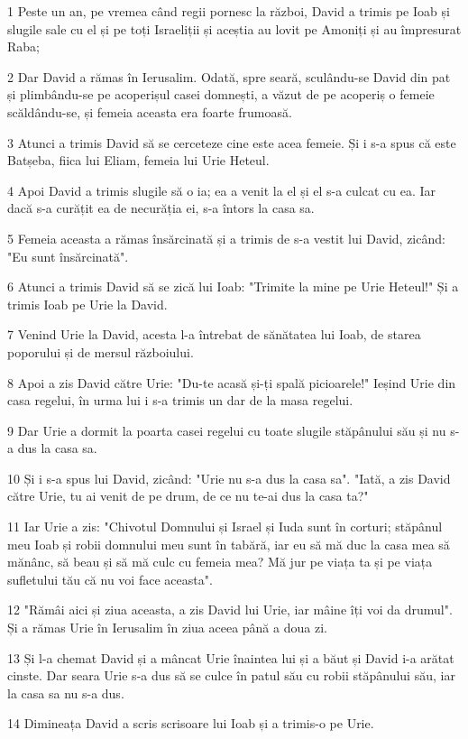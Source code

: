 \par 1 Peste un an, pe vremea când regii pornesc la război, David a trimis pe Ioab și slugile sale cu el și pe toți Israeliții și aceștia au lovit pe Amoniți și au împresurat Raba;
\par 2 Dar David a rămas în Ierusalim. Odată, spre seară, sculându-se David din pat și plimbându-se pe acoperișul casei domnești, a văzut de pe acoperiș o femeie scăldându-se, și femeia aceasta era foarte frumoasă.
\par 3 Atunci a trimis David să se cerceteze cine este acea femeie. Și i s-a spus că este Batșeba, fiica lui Eliam, femeia lui Urie Heteul.
\par 4 Apoi David a trimis slugile să o ia; ea a venit la el și el s-a culcat cu ea. Iar dacă s-a curățit ea de necurăția ei, s-a întors la casa sa.
\par 5 Femeia aceasta a rămas însărcinată și a trimis de s-a vestit lui David, zicând: "Eu sunt însărcinată".
\par 6 Atunci a trimis David să se zică lui Ioab: "Trimite la mine pe Urie Heteul!" Și a trimis Ioab pe Urie la David.
\par 7 Venind Urie la David, acesta l-a întrebat de sănătatea lui Ioab, de starea poporului și de mersul războiului.
\par 8 Apoi a zis David către Urie: "Du-te acasă și-ți spală picioarele!" Ieșind Urie din casa regelui, în urma lui i s-a trimis un dar de la masa regelui.
\par 9 Dar Urie a dormit la poarta casei regelui cu toate slugile stăpânului său și nu s-a dus la casa sa.
\par 10 Și i s-a spus lui David, zicând: "Urie nu s-a dus la casa sa". "Iată, a zis David către Urie, tu ai venit de pe drum, de ce nu te-ai dus la casa ta?"
\par 11 Iar Urie a zis: "Chivotul Domnului și Israel și Iuda sunt în corturi; stăpânul meu Ioab și robii domnului meu sunt în tabără, iar eu să mă duc la casa mea să mănânc, să beau și să mă culc cu femeia mea? Mă jur pe viața ta și pe viața sufletului tău că nu voi face aceasta".
\par 12 "Rămâi aici și ziua aceasta, a zis David lui Urie, iar mâine îți voi da drumul". Și a rămas Urie în Ierusalim în ziua aceea până a doua zi.
\par 13 Și l-a chemat David și a mâncat Urie înaintea lui și a băut și David i-a arătat cinste. Dar seara Urie s-a dus să se culce în patul său cu robii stăpânului său, iar la casa sa nu s-a dus.
\par 14 Dimineața David a scris scrisoare lui Ioab și a trimis-o pe Urie.
